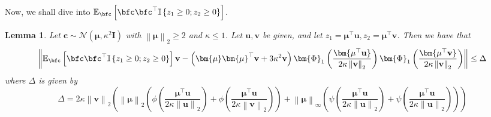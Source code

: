 \documentclass[10pt]{article} %
\newtheorem{lemma}[theorem]{Lemma}
\theoremstyle{definition}
\theoremstyle{plain}
\newcommand{\paren}[1]{\left(#1\right)}
\newcommand{\norm}[1]{\left\|#1\right\|}
\providecommand{\E}{\mathbb{E}}
\def\bfI{{\mathbf{I}}}\def\bfJ{{\mathbf{J}}}\def\bfK{{\mathbf{K}}}\def\bfL{{\mathbf{L}}}
\def\bfu{{\mathbf{u}}}\def\bfv{{\mathbf{v}}}\def\bfw{{\mathbf{w}}}\def\bfx{{\mathbf{x}}}
\begin{document}
Now, we shall dive into $\E_{\bfc}\left[\bfc\bfc^\top\mathbb{I}\left\{z_1\geq 0;z_2\geq 0\right\}\right]$.
\begin{lemma}
    \label{lem:exp_grad_1st_prod}
    Let $\bm{c}\sim\mathcal{N}\paren{\bm{\mu},\kappa^2\bfI}$ with $\norm{\bm{\mu}}_2\geq 2$ and $\kappa \leq 1$. Let $\bfu,\bfv$ be given, and let $z_1 = \bm{\mu}^\top\bfu, z_2 = \bm{\mu}^\top\bfv$. Then we have that
    \[
        \norm{\E_{\bfc}\left[\bfc\bfc^\top\mathbb{I}\left\{z_1\geq 0;z_2\geq 0\right\}\right]\bfv - \paren{\bm{\mu}\bm{\mu}^\top\bfv + 3\kappa^2\bfv}\bm{\Phi}_1\paren{\frac{\bm{\mu^\top\bfu}}{2\kappa\norm{\bfv}_2}}\bm{\Phi}_1\paren{\frac{\bm{\mu^\top\bfv}}{2\kappa\norm{\bfv}_2}}} \leq \Delta
    \]
    where $\Delta$ is given by
    \[
        \Delta = 2\kappa\norm{\bfv}_2\paren{\norm{\bm{\mu}}_2\paren{\phi\paren{\frac{\bm{\mu^\top\bfu}}{2\kappa\norm{\bfu}_2}} + \phi\paren{\frac{\bm{\mu^\top\bfu}}{2\kappa\norm{\bfv}_2}}} +\norm{\bm{\mu}}_{\infty}\paren{\psi\paren{\frac{\bm{\mu^\top\bfu}}{2\kappa\norm{\bfu}_2}} + \psi\paren{\frac{\bm{\mu^\top\bfu}}{2\kappa\norm{\bfu}_2}}}}
    \]
\end{lemma}
\end{document}
